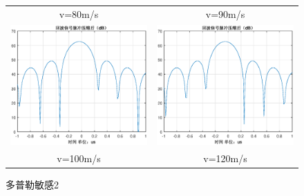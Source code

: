 \documentclass[12pt]{article}
\begin{document}
\begin{figure}[htbp]
\begin{tabular}{cc}
    v=80m/s&v=90m/s\\
  \includegraphics[width=.5\textwidth]{Doppler_sensitivity_0100}&\includegraphics[width=.5\textwidth]{Doppler_sensitivity_0120}\\
    v=100m/s&v=120m/s\\
  \end{tabular}
  \caption{多普勒敏感2}\label{Doppler_sensitivity_0002}
\end{figure}
\end{document}
